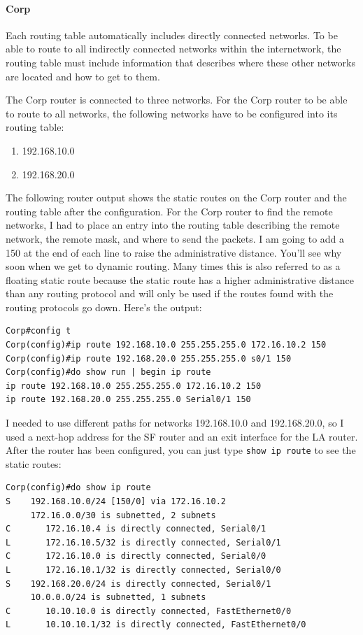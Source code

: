 \paragraph{Corp}

Each routing table automatically includes directly connected networks.
To be able to route to all indirectly connected networks within the
internetwork, the routing table must include information that describes
where these other networks are located and how to get to them.

The Corp router is connected to three networks. For the Corp router to
be able to route to all networks, the following networks have to be
configured into its routing table:

\begin{enumerate}
\tightlist
\item
  192.168.10.0
\item
  192.168.20.0
\end{enumerate}

The following router output shows the static routes on the Corp router
and the routing table after the configuration. For the Corp router to
find the remote networks, I had to place an entry into the routing table
describing the remote network, the remote mask, and where to send the
packets. I am going to add a 150 at the end of each line to raise the
administrative distance. You'll see why soon when we get to dynamic
routing. Many times this is also referred to as a floating static route
because the static route has a higher
\protect\hypertarget{c09.xhtmlux5cux23Page_385}{}{}administrative
distance than any routing protocol and will only be used if the routes
found with the routing protocols go down. Here's the output:

\begin{verbatim}
Corp#config t
Corp(config)#ip route 192.168.10.0 255.255.255.0 172.16.10.2 150
Corp(config)#ip route 192.168.20.0 255.255.255.0 s0/1 150
Corp(config)#do show run | begin ip route
ip route 192.168.10.0 255.255.255.0 172.16.10.2 150
ip route 192.168.20.0 255.255.255.0 Serial0/1 150
\end{verbatim}

I needed to use different paths for networks 192.168.10.0 and
192.168.20.0, so I used a next-hop address for the SF router and an exit
interface for the LA router. After the router has been configured, you
can just type \texttt{show\ ip\ route} to see the static routes:

\begin{verbatim}
Corp(config)#do show ip route
S    192.168.10.0/24 [150/0] via 172.16.10.2
     172.16.0.0/30 is subnetted, 2 subnets
C       172.16.10.4 is directly connected, Serial0/1
L       172.16.10.5/32 is directly connected, Serial0/1
C       172.16.10.0 is directly connected, Serial0/0
L       172.16.10.1/32 is directly connected, Serial0/0
S    192.168.20.0/24 is directly connected, Serial0/1
     10.0.0.0/24 is subnetted, 1 subnets
C       10.10.10.0 is directly connected, FastEthernet0/0
L       10.10.10.1/32 is directly connected, FastEthernet0/0
\end{verbatim}

